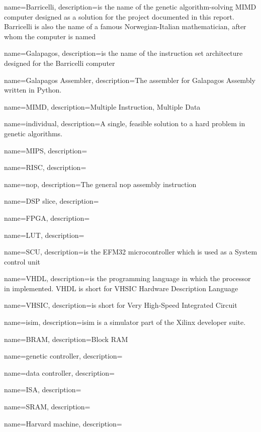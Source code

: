 {
name=Barricelli,
description={is the name of the genetic algorithm-solving MIMD computer designed as a solution for the project documented in this report. Barricelli is also the name of a famous Norwegian-Italian mathematician, after whom the computer is named}
}

{
name=Galapagos,
description={is the name of the instruction set architecture designed for the Barricelli computer}
}

{
name=Galapagos Assembler,
description={The assembler for Galapagos Assembly written in Python.}
}

{
name=MIMD,
description={Multiple Instruction, Multiple Data}
}

{
name=individual,
description={A single, feasible solution to a hard problem in genetic algorithms.}
}

{
name=MIPS,
description={}
}

{
name=RISC,
description={}
}

{
name=nop,
description={The general nop assembly instruction }
}

{
name=DSP slice,
description={}
}

{
name=FPGA,
description={}
}

{
name=LUT,
description={}
}

{
name=SCU,
description={is the EFM32 microcontroller which is used as a System control unit}
}

{
name=VHDL,
description={is the programming language in which the processor in implemented. VHDL is short for \gls{VHSIC} Hardware Description Language}
}

{
name=VHSIC,
description={is short for Very High-Speed Integrated Circuit}
}

{
name=isim,
description={isim is a simulator part of the Xilinx developer suite.}
}

{
name=BRAM,
description={Block RAM }
}

{
name=genetic controller,
description={}
}

{
name=data controller,
description={}
}

{
name=ISA,
description={}
}

{
name=SRAM,
description={}
}

{
name=Harvard machine,
description={}
}
